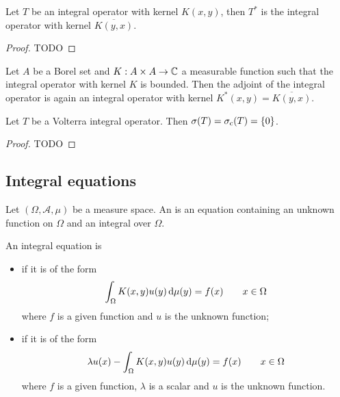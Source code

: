 \begin{proposition}
Let $T$ be an integral operator with kernel $K(x,y)$, then $T^*$ is the integral operator with kernel $\overline{K(y,x)}$.
\end{proposition}
\begin{proof}
TODO
\end{proof}

\begin{proposition}
Let $A$ be a Borel set and $K:A\times A\to \mathbb{C}$ a measurable function such that the integral operator with kernel $K$ is bounded. Then the adjoint of the integral operator is again an integral operator with kernel $K^*(x,y) = \overline{K(y,x)}$.
\end{proposition}

\begin{proposition}
Let $T$ be a Volterra integral operator. Then $\sigma(T) = \sigma_\text{c}(T) = \{0\}$.
\end{proposition}
\begin{proof}
TODO
\end{proof}

\subsection{Integral equations}
\begin{definition}
Let $(\Omega, \mathcal{A}, \mu)$ be a measure space. An  is an equation containing an unknown function on $\Omega$ and an integral over $\Omega$.

An integral equation is 
\begin{itemize}
\item {} if it is of the form
\[ \int_\Omega K(x,y)u(y)\operatorname{d \!}{\mu(y)} = f(x) \qquad x\in \Omega \]
where $f$ is a given function and $u$ is the unknown function;
\item {} if it is of the form
\[ \lambda u(x) - \int_\Omega K(x,y)u(y)\operatorname{d \!}{\mu(y)} = f(x) \qquad x\in \Omega \]
where $f$ is a given function, $\lambda$ is a scalar and $u$ is the unknown function.
\end{itemize}
\end{definition}

